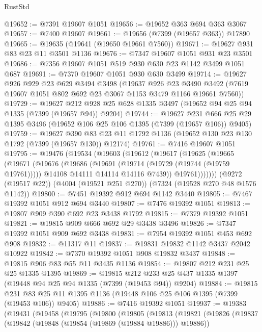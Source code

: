 \begin{lexlean}{RustStd}
\begin{coremodule}
@19652 := @7391 @19607 @1051
@19656 := @19652 @363 @694 @363 @3067
@19657 := @7400 @19607
@19661 := @19656 (@7399 (@19657 @363)) @17890
@19665 := @19635 (@19641 (@19650 @19661 @7560))
@19671 := @19627 @931 @83 @23 @11 @3501 @1136
@19676 := @7347 @19607 @1051 @931 @23 @3501
@19686 := @7356 @19607 @1051 @519 @930 @630 @23 @1142 @3499 @1051 @687
@19691 := @7370 @19607 @1051 @930 @630 @3499
@19714 := @19627
    @926
    @929
    @23
    @629
    @3494
    @3498
    (@19637
      @926
      @23
      @3490
      @3492
      (@7619 @19607 @1051 @802 @692 @23 @3067 @1153 @3479 @1166 @19661 @7560))
@19729 := @19627
    @212
    @928
    @25
    @628
    @1335
    @3497
    (@19652 @94 @25 @94 @1335 (@7399 (@19657 @94)) @9204)
@19744 := @19627
    @231
    @666
    @25
    @29
    @1395
    @3496
    (@19652 @106 @25 @106 @1395 (@7399 (@19657 @106)) @9405)
@19759 := @19627
    @390
    @83
    @23
    @11
    @1792
    @1136
    (@19652 @130 @23 @130 @1792 (@7399 (@19657 @130)) @12174)
@19761 := @7416 @19607 @1051
@19795 := @19476
    (@19534
      (@19603
        (@19612
          (@19617
            (@19625
              (@19665
                (@19671
                  (@19676
                    (@19686
                      (@19691 (@19714 (@19729 (@19744 (@19759 @19761)))))
                      @14108
                      @14111
                      @14114
                      @14116
                      @7439))
                  @19761)))))))
    (@9272 (@19517 @22))
    (@4004 (@19521 @251 @270))
    (@7324 (@19528 @270 @48 @1576 @1142))
@19800 := @7451 @19392 @912 @694 @1142 @3440
@19805 := @7467 @19392 @1051 @912 @694 @3440
@19807 := @7476 @19392 @1051
@19813 := @19807 @909 @390 @692 @23 @3438 @1792
@19815 := @7379 @19392 @1051
@19821 := @19815 @909 @666 @692 @29 @3438 @3496
@19826 := @7347 @19392 @1051 @909 @692 @3438
@19831 := @7954 @19392 @1051 @453 @692 @908
@19832 := @11317 @11
@19837 := @19831 @19832 @1142 @3437 @2042 @10922
@19842 := @7370 @19392 @1051 @908 @19832 @3437
@19848 := @19815 @906 @83 @55 @11 @3435 @1136
@19854 := @19807 @212 @231 @25 @25 @1335 @1395
@19869 := @19815
    @212
    @233
    @25
    @437
    @1335
    @1397
    (@19448 @94 @25 @94 @1335 (@7399 (@19453 @94)) @9204)
@19884 := @19815
    @231
    @83
    @25
    @11
    @1395
    @1136
    (@19448 @106 @25 @106 @1395 (@7399 (@19453 @106)) @9405)
@19886 := @7416 @19392 @1051
@19937 := @19383
    (@19431
      (@19458
        (@19795
          (@19800
            (@19805
              (@19813
                (@19821
                  (@19826
                    (@19837
                      (@19842 (@19848 (@19854 (@19869 (@19884 @19886))) @19886))

\end{coremodule}
\end{lexlean}
